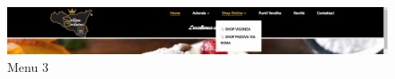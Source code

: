 \begin{figure}[H]
	\centering\includegraphics[width=12cm]{Img/menu3.png}
	\caption{Menu 3}
\end{figure}

\pagebreak